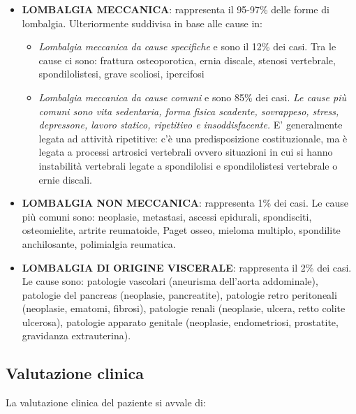\begin{itemize}
\item
   
  \textbf{LOMBALGIA MECCANICA}: rappresenta il 95-97\% delle forme di
  lombalgia. Ulteriormente suddivisa in base alle cause in:


\begin{itemize}
\item
  \emph{Lombalgia meccanica da cause specifiche} e sono il 12\% dei
  casi. Tra le cause ci sono: frattura osteoporotica, ernia discale,
  stenosi vertebrale, spondilolistesi, grave scoliosi, ipercifosi
\item
  \emph{Lombalgia meccanica da cause comuni} e sono 85\% dei casi.
  \emph{Le cause più comuni sono vita sedentaria, forma fisica scadente,
  sovrappeso, stress, depressone, lavoro statico, ripetitivo e
  insoddisfacente.} E' generalmente legata ad attività ripetitive: c'è
  una predisposizione costituzionale, ma è legata a processi artrosici
  vertebrali ovvero situazioni in cui si hanno instabilità vertebrali
  legate a spondilolisi e spondilolistesi vertebrale o ernie discali.
\end{itemize}

\item
   
  \textbf{LOMBALGIA NON MECCANICA}: rappresenta 1\% dei casi. Le cause
  più comuni sono: neoplasie, metastasi, ascessi epidurali, spondisciti,
  osteomielite, artrite reumatoide, Paget osseo, mieloma multiplo,
  spondilite anchilosante, polimialgia reumatica.

\item
   
  \textbf{LOMBALGIA DI ORIGINE VISCERALE}: rappresenta il 2\% dei casi.
  Le cause sono: patologie vascolari (aneurisma dell'aorta addominale),
  patologie del pancreas (neoplasie, pancreatite), patologie retro
  peritoneali (neoplasie, ematomi, fibrosi), patologie renali
  (neoplasie, ulcera, retto colite ulcerosa), patologie apparato
  genitale (neoplasie, endometriosi, prostatite, gravidanza
  extrauterina).
   
\end{itemize}

\subsection{Valutazione clinica}


La valutazione clinica del paziente si avvale di:

